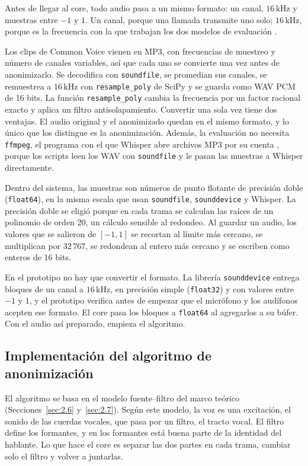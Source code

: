 \documentclass[10pt,twocolumn]{article}
\newcommand{\parencite}[1]{\citep{#1}}
\begin{document}
Antes de llegar al core, todo audio pasa a un mismo formato: un canal, $16\,\mathrm{kHz}$ y muestras entre $-1$ y $1$. Un canal, porque una llamada transmite uno solo; $16\,\mathrm{kHz}$, porque es la frecuencia con la que trabajan los dos modelos de evaluación \parencite{openaiwhisper2025,speechbrainModel}.

Los clips de Common Voice vienen en MP3, con frecuencias de muestreo y número de canales variables, así que cada uno se convierte una vez antes de anonimizarlo. Se decodifica con \texttt{soundfile}, se promedian sus canales, se remuestrea a $16\,\mathrm{kHz}$ con \texttt{resample\_poly} de SciPy y se guarda como WAV PCM de 16 bits. La función \texttt{resample\_poly} cambia la frecuencia por un factor racional exacto y aplica un filtro antisolapamiento. Convertir una sola vez tiene dos ventajas. El audio original y el anonimizado quedan en el mismo formato, y lo único que los distingue es la anonimización. Además, la evaluación no necesita \texttt{ffmpeg}, el programa con el que Whisper abre archivos MP3 por su cuenta \parencite{openaiwhisper2025}, porque los scripts leen los WAV con \texttt{soundfile} y le pasan las muestras a Whisper directamente.

Dentro del sistema, las muestras son números de punto flotante de precisión doble (\texttt{float64}), en la misma escala que usan \texttt{soundfile}, \texttt{sounddevice} y Whisper. La precisión doble se eligió porque en cada trama se calculan las raíces de un polinomio de orden 20, un cálculo sensible al redondeo. Al guardar un audio, los valores que se salieron de $[-1,1]$ se recortan al límite más cercano, se multiplican por $32\,767$, se redondean al entero más cercano y se escriben como enteros de 16 bits.

En el prototipo no hay que convertir el formato. La librería \texttt{sounddevice} entrega bloques de un canal a $16\,\mathrm{kHz}$, en precisión simple (\texttt{float32}) y con valores entre $-1$ y $1$, y el prototipo verifica antes de empezar que el micrófono y los audífonos acepten ese formato. El core pasa los bloques a \texttt{float64} al agregarlos a su búfer. Con el audio así preparado, empieza el algoritmo.

\subsection{Implementación del algoritmo de anonimización}\label{sec:4.3}

El algoritmo se basa en el modelo fuente--filtro del marco teórico (Secciones~\ref{sec:2.6} y~\ref{sec:2.7}). Según este modelo, la voz es una excitación, el sonido de las cuerdas vocales, que pasa por un filtro, el tracto vocal. El filtro define los formantes, y en los formantes está buena parte de la identidad del hablante. Lo que hace el core es separar las dos partes en cada trama, cambiar solo el filtro y volver a juntarlas.
\end{document}
